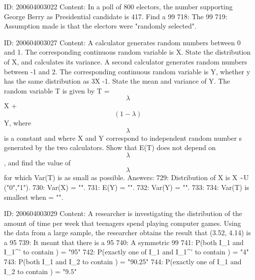 \documentclass{article}
\begin{document}
ID: 200604003022
Content:
In a poll of 800 electors, the number supporting George Berry as Presidential candidate is 417. Find a 99%
718: The 99%
719: Assumption made is that the electors were "randomly selected".

ID: 200604003027
Content:
A calculator generates random numbers between 0 and 1. The corresponding continuous random variable is X. State the distribution of X, and calculates its variance.  A second calculator generates random numbers between -1 and 2. The corresponding continuous random variable is Y, whether y has the same distribution as 3X -1. State the mean and variance of Y.  The random variable T is given by T = $$\lambda$$ X + $$(1-\lambda)$$Y, where $$\lambda$$ is a constant and where X and Y correspond to independent random number s generated by the two calculators. Show that E(T) does not depend on $$\lambda$$, and find the value of $$\lambda$$ for which Var(T) is as small as possible. Answers:
729: Distribution of X is X \sim U ("0","1").
730: Var(X) = "".
731: E(Y) = "".
732: Var(Y) = "".
733: 
734: Var(T) is smallest when \lambda = "".

ID: 200604003029
Content:
A researcher is investigating the distribution of the amount of time per week that teenagers spend playing computer games. Using the data from a large sample, the researcher obtains the result that (3.52, 4.14) is a 95%
739: It meant that there is a 95%
740: A symmetric 99%
741: P(both I_1 and {I_1}^' to contain \mu) = "95"%
742: P(exactly one of I_1 and {I_1}^' to contain \mu) = "4"%
743:  P(both I_1 and I_2 to contain \mu) = "90.25"%
744:  P(exactly one of I_1 and I_2 to contain \mu) = "9.5"%
\end{document}
